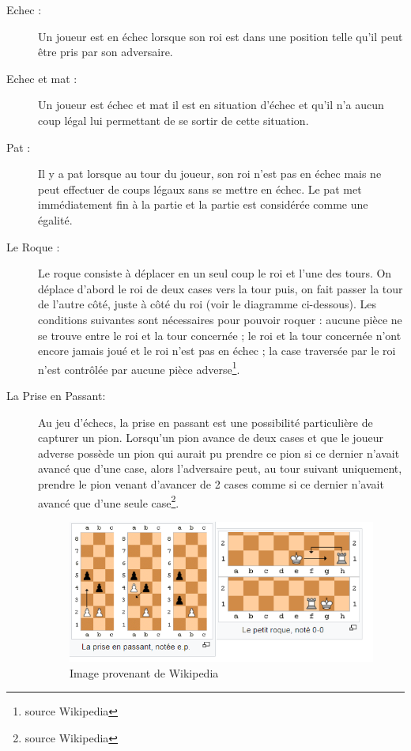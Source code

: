 \documentclass[10pt, a4paper]{article}
\begin{document}
\begin{description}
		\item[Echec :] Un joueur est en échec lorsque son roi est dans une position telle qu'il peut être pris par son adversaire.
		\item[Echec et mat :] Un joueur est échec et mat il est en situation d'échec et qu'il n'a aucun coup légal lui permettant de se sortir de cette situation.
		\item[Pat :] Il y a pat lorsque au tour du joueur, son roi n'est pas en échec mais ne peut effectuer de coups légaux sans se mettre en échec. Le pat met immédiatement fin à la partie et la partie est considérée comme une égalité.
		\item[Le Roque :] Le roque consiste à déplacer en un seul coup le roi et l'une des tours. On déplace d'abord le roi de deux cases vers la tour puis, on fait passer la tour de l'autre côté, juste à côté du roi (voir le diagramme ci-dessous). Les conditions suivantes sont nécessaires pour pouvoir roquer : aucune pièce ne se trouve entre le roi et la tour concernée ; le roi et la tour concernée n'ont encore jamais joué et le roi n'est pas en échec ;
la case traversée par le roi n'est contrôlée par aucune pièce adverse\footnote{source Wikipedia}.
		\item[La Prise en Passant:] Au jeu d’échecs, la prise en passant est une possibilité particulière de capturer un pion. Lorsqu’un pion avance de deux cases et que le joueur adverse possède un pion qui aurait pu prendre ce pion si ce dernier n'avait avancé que d'une case, alors l'adversaire peut, au tour suivant uniquement, prendre le pion venant d'avancer de 2 cases comme si ce dernier n'avait avancé que d'une seule case\footnote{source Wikipedia}.
		\begin{figure}[bh]
		\centering
		\includegraphics[scale=1]{roque_prise_passant.png}
		\caption{Image provenant de Wikipedia}
		\end{figure}

		\end{description}
		\clearpage
\end{document}

